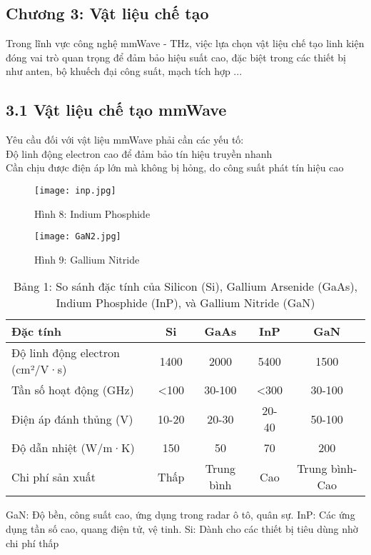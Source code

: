 \documentclass[a4paper,13pt]{article} %
\begin{document}
\begin{center}
    \section{Chương 3: Vật liệu chế tạo}
\end{center}
Trong lĩnh vực công nghệ mmWave - THz, việc lựa chọn vật liệu chế tạo linh kiện đóng vai trò quan trọng để đảm bảo hiệu suất cao, đặc biệt trong các thiết bị như anten, bộ khuếch đại công suất, mạch tích hợp ...
\subsection{3.1 Vật liệu chế tạo mmWave}
Yêu cầu đối với vật liệu mmWave phải cần các yếu tố: \\
Độ linh động electron cao để đảm bảo tín hiệu truyền nhanh\\ Cần chịu được điện áp lớn mà không bị hỏng, do công suất phát tín hiệu cao
\begin{figure}[htbp]
    \centering
    \texttt{[image: inp.jpg]}
    \caption*{Hình 8: Indium Phosphide \cite{key5} }
    \texttt{[image: GaN2.jpg]}
    \caption*{Hình 9: Gallium Nitride   }
    \label{fig:model}
\end{figure}

\begin{table}[h]
    \centering
    \caption{Bảng 1: So sánh đặc tính của Silicon (Si), Gallium Arsenide (GaAs), Indium Phosphide (InP), và Gallium Nitride (GaN)}
    \begin{tabular}{lcccc}
        \toprule
        \textbf{Đặc tính} & \textbf{Si} & \textbf{GaAs} & \textbf{InP} & \textbf{GaN} \\
        \midrule
        Độ linh động electron (cm²/V·s) & 1400 & 2000 & 5400 & 1500 \\
        Tần số hoạt động (GHz) & <100 & 30-100 & <300 & 30-100 \\
        Điện áp đánh thủng (V) & 10-20 & 20-30 & 20-40 & 50-100 \\
        Độ dẫn nhiệt (W/m·K) & 150 & 50 & 70 & 200 \\
        Chi phí sản xuất & Thấp & Trung bình & Cao & Trung bình-Cao \\
        \bottomrule
    \end{tabular}
    \label{tab:material_comparison}
\end{table} GaN: Độ bền, công suất cao, ứng dụng trong radar ô tô, quân sự. InP: Các ứng dụng tần số cao, quang điện tử, vệ tinh. Si: Dành cho các thiết bị tiêu dùng nhờ chi phí thấp
\end{document}
